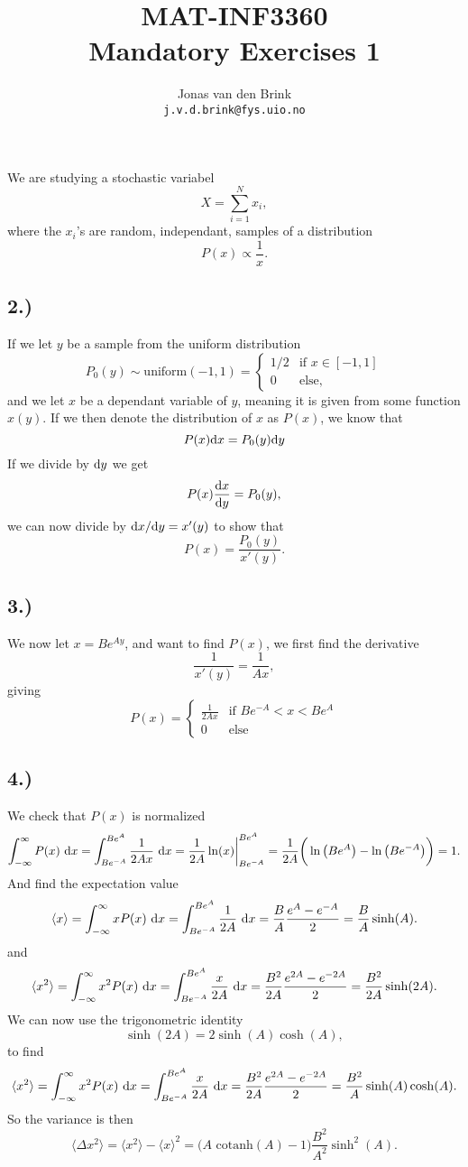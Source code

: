 \documentclass[a4paper, 11pt, notitlepage, english]{article}
\author{Jonas van den Brink \\ \texttt{j.v.d.brink@fys.uio.no}}
\title{MAT-INF3360 \\ Mandatory Exercises 1}
\renewcommand{\d}{{\rm d}}
\begin{document}
We are studying a stochastic variabel
$$X = \sum_{i=1}^N x_i,$$
where the $x_i$'s are random, independant, samples of a distribution
$$P(x) \propto \frac{1}{x}.$$

\subsection*{2.)}
If we let $y$ be a sample from the uniform distribution
$$P_0(y) \sim \mbox{uniform}(-1,1) = \begin{cases}
    1/2 & \mbox{if } x\in[-1,1] \\
    0 & \mbox{else},
\end{cases}$$
and we let $x$ be a dependant variable of $y$, meaning it is given from some function
$x(y)$. If we then denote the distribution of $x$ as $P(x)$, we know that
$$P(x) \d x = P_0(y)  \d y$$
If we divide by $\d y$ we get
$$P(x) \frac{\d x}{\d y} = P_0(y),$$
we can now divide by $\d x/\d y = x'(y)$ to show that
$$P(x) = \frac{P_0(y)}{x'(y)}.$$

\subsection*{3.)}
We now let $x = Be^{Ay}$, and want to find $P(x)$, we first find the derivative
$$\frac{1}{x'(y)} = \frac{1}{Ax},$$
giving
$$P(x) = \begin{cases}
    \frac{1}{2Ax} & \mbox{if }  Be^{-A} < x < Be^A \\
    0 & \mbox{else}
\end{cases} $$

\subsection*{4.)}
We check that $P(x)$ is normalized
$$\int_{-\infty}^\infty P(x) \ \d x = \int_{Be^{-A}}^{Be^{A}} \frac{1}{2Ax}\ \d x = \frac{1}{2A}\ln(x)\bigg|_{Be^{-A}}^{Be^{A}} = \frac{1}{2A}\bigg(\ln\big(Be^A\big) - \ln\big({Be^{-A}}\big)\bigg) = 1.$$
And find the expectation value
$$\langle x \rangle = \int_{-\infty}^\infty x P(x) \ \d x = \int_{Be^{-A}}^{Be^{A}} \frac{1}{2A}\ \d x = \frac{B}{A}\frac{e^A - e^{-A}}{2} = \frac{B}{A}\sinh(A).$$
and
$$\langle x^2 \rangle = \int_{-\infty}^\infty x^2 P(x) \ \d x = \int_{Be^{-A}}^{Be^{A}} \frac{x}{2A}\ \d x = \frac{B^2}{2A}\frac{e^{2A} - e^{-2A}}{2} = \frac{B^2}{2A}\sinh(2A).$$
We can now use the trigonometric identity
$$\sinh(2A) = 2\sinh(A)\cosh(A),$$
to find
$$\langle x^2 \rangle = \int_{-\infty}^\infty x^2 P(x) \ \d x = \int_{Be^{-A}}^{Be^{A}} \frac{x}{2A}\ \d x = \frac{B^2}{2A}\frac{e^{2A} - e^{-2A}}{2} = \frac{B^2}{A}\sinh(A)\cosh(A).$$
So the variance is then
$$\langle \Delta x^2 \rangle = \langle x ^2\rangle - \langle x \rangle^2 = \big(A\mbox{ cotanh}(A)-1\big)\frac{B^2}{A^2}\sinh^2(A).$$
\end{document}
